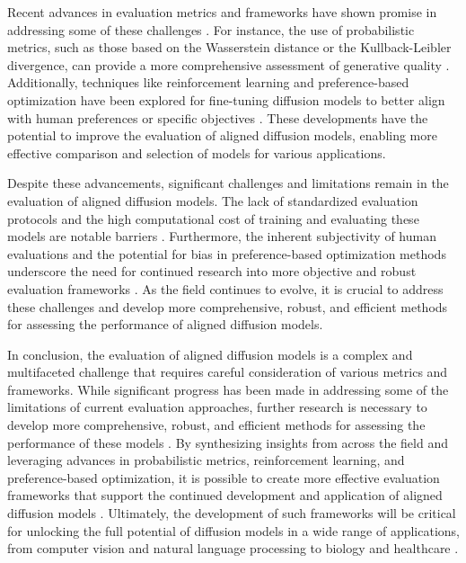 \documentclass[11pt,a4paper]{article}
\begin{document}
Recent advances in evaluation metrics and frameworks have shown promise in addressing some of these challenges \cite{arxiv:2402.07802}. For instance, the use of probabilistic metrics, such as those based on the Wasserstein distance or the Kullback-Leibler divergence, can provide a more comprehensive assessment of generative quality \cite{doi:10.1098/rsos.211361}. Additionally, techniques like reinforcement learning and preference-based optimization have been explored for fine-tuning diffusion models to better align with human preferences or specific objectives \cite{arxiv:2402.16359}. These developments have the potential to improve the evaluation of aligned diffusion models, enabling more effective comparison and selection of models for various applications.

Despite these advancements, significant challenges and limitations remain in the evaluation of aligned diffusion models. The lack of standardized evaluation protocols and the high computational cost of training and evaluating these models are notable barriers \cite{arxiv:2502.06805}. Furthermore, the inherent subjectivity of human evaluations and the potential for bias in preference-based optimization methods underscore the need for continued research into more objective and robust evaluation frameworks \cite{arxiv:2407.01648}. As the field continues to evolve, it is crucial to address these challenges and develop more comprehensive, robust, and efficient methods for assessing the performance of aligned diffusion models.

In conclusion, the evaluation of aligned diffusion models is a complex and multifaceted challenge that requires careful consideration of various metrics and frameworks. While significant progress has been made in addressing some of the limitations of current evaluation approaches, further research is necessary to develop more comprehensive, robust, and efficient methods for assessing the performance of these models \cite{arxiv:2302.10907}. By synthesizing insights from across the field and leveraging advances in probabilistic metrics, reinforcement learning, and preference-based optimization, it is possible to create more effective evaluation frameworks that support the continued development and application of aligned diffusion models \cite{arxiv:2410.00083}. Ultimately, the development of such frameworks will be critical for unlocking the full potential of diffusion models in a wide range of applications, from computer vision and natural language processing to biology and healthcare \cite{doi:10.3389/frobt.2025.1606247}.
\end{document}
